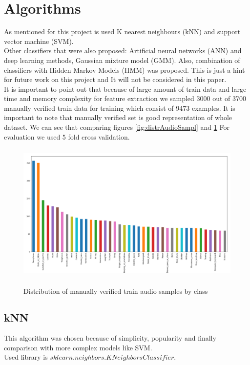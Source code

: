 \documentclass{article}
\begin{document}
\section{Algorithms}
As mentioned for this project is used K nearest neighbours (kNN) and support vector machine (SVM). \\
Other classifiers that were also proposed: Artificial neural networks (ANN) and deep learning methods, 
Gaussian mixture model (GMM). Also, combination of classifiers with Hidden Markov Models (HMM) was proposed. 
This is just a hint for future work on this project and It will not be considered in this paper.\\
It is important to point out that because of large amount of train data and large time and memory complexity 
for feature extraction we sampled 3000 out of 3700 manually verified train data for training which consist of 9473
examples. It is important to note that manually verified set is good representation of whole dataset. We can see that 
comparing figures \ref{fig:distrAudioSampl} and \ref{fig:distrAudioSamplMan}
For evaluation we used 5 fold cross validation.\\

\begin{figure}[!htb]
\includegraphics[width=15cm, height=7cm]{distrAudioSamplMan}\\
\caption{Distribution of manually verified train audio samples by class}
\label{fig:distrAudioSamplMan}
\centering
\end{figure}

\subsection{kNN}
This algorithm was chosen because of simplicity, popularity and finally comparison with more complex models like
SVM.\\
Used library is $sklearn.neighbors.KNeighborsClassifier$. \\
\end{document}

